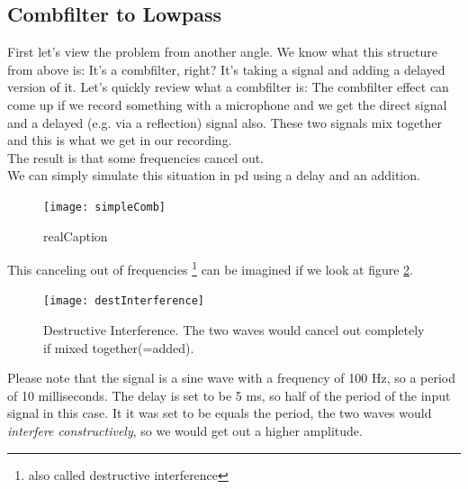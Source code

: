 \subsection{Combfilter to Lowpass}
First let's view the problem from another angle. We know what this structure from above is: It's a combfilter, right? It's taking a signal and adding a delayed version of it. Let's quickly review what a combfilter is:
The combfilter effect can come up if we record something with a microphone and we get the direct signal and a delayed (e.g. via a reflection) signal also. These two signals mix together and this is what we get in our recording.\\
The result is that some frequencies cancel out.\\
We can simply simulate this situation in pd using a delay and an addition. 

\begin{figure}[H]
	\centering
	\texttt{[image: simpleComb]}
	\caption[shortCaption]
	{realCaption}
	\label{fig:label}
\end{figure}

This canceling out of frequencies \footnote{also called destructive interference} can be imagined if we look at figure \ref{fig:destIntereference}. 
\begin{figure}[H]
	\centering
	\texttt{[image: destInterference]}
	\caption[Destructive Interference]
	{Destructive Interference. The two waves would cancel out completely if mixed together(=added).}
	\label{fig:destIntereference}
\end{figure}

Please note that the signal is a sine wave with a frequency of 100 Hz, so a period of 10 milliseconds. The delay is set to be 5 ms, so half of the period of the input signal in this case. It it was set to be equals the period, the two waves would \textit{interfere constructively}, so we would get out a higher amplitude. \\


